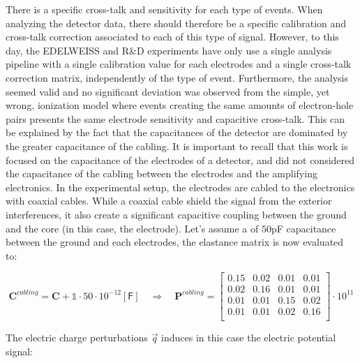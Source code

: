 There is a specific cross-talk and sensitivity for each type of events. When analyzing the detector data, there should therefore be a specific calibration and cross-talk correction associated to each of this type of signal.
However, to this day, the EDELWEISS and R\&D experiments have only use a single analysis pipeline with a single calibration value for each electrodes and a single cross-talk correction matrix, independently of the type of event. Furthermore, the analysis seemed valid and no significant deviation was observed from the simple, yet wrong, ionization model where events creating the same amounts of electron-hole pairs presents the same electrode sensitivity and capacitive cross-talk. This can be explained by the fact that the capacitances of the detector are dominated by the greater capacitance of the cabling. It is important to recall that this work is focused on the capacitance of the electrodes of a detector, and did not considered the capacitance of the cabling between the electrodes and the amplifying electronics. In the experimental setup, the electrodes are cabled to the electronics with coaxial cables. While a coaxial cable shield the signal from the exterior interferences, it also create a significant capacitive coupling between the ground and the core (in this case, the electrode). Let's assume a of $50$pF capacitance between the ground and each electrodes, the elastance matrix is now evaluated to:

\begin{equation}
\bm{C}^{cabling} = \bm{C} + \mathbb{1} \cdot 50 \cdot 10^{-12} [\textsf{F}]
\quad \Rightarrow \quad
\bm{P}^{cabling} = 
\begin{bmatrix}
  0.15 & 0.02 & 0.01 & 0.01\\
  0.02 & 0.16 & 0.01 & 0.01\\
  0.01 & 0.01 & 0.15 & 0.02\\
  0.01 & 0.01 & 0.02 & 0.16\\
\end{bmatrix}
\cdot 10^{11}
\end{equation}

The electric charge perturbations $\vec{q}$ induces in this case the electric potential signal:

